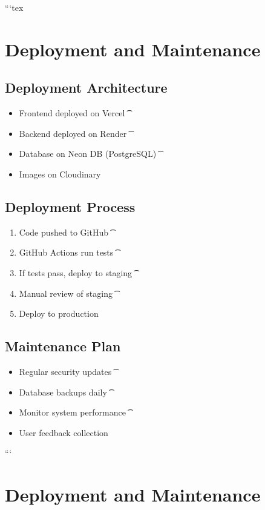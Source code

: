 ```tex
\section{Deployment and Maintenance}

\subsection{Deployment Architecture}
\begin{itemize}[leftmargin=*]
\t\item Frontend deployed on Vercel
\t\item Backend deployed on Render
\t\item Database on Neon DB (PostgreSQL)
\t\item Images on Cloudinary
\end{itemize}

\subsection{Deployment Process}
\begin{enumerate}[leftmargin=*]
\t\item Code pushed to GitHub
\t\item GitHub Actions run tests
\t\item If tests pass, deploy to staging
\t\item Manual review of staging
\t\item Deploy to production
\end{enumerate}

\subsection{Maintenance Plan}
\begin{itemize}[leftmargin=*]
\t\item Regular security updates
\t\item Database backups daily
\t\item Monitor system performance
\t\item User feedback collection
\end{itemize}

```
\section{Deployment and Maintenance}

